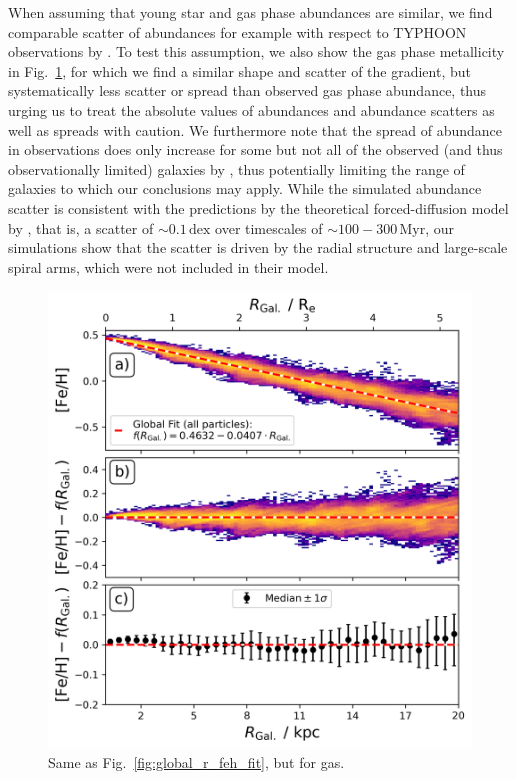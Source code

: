 \documentclass[twocolumn,apj,numberedappendix,appendixfloats]{openjournal}
\begin{document}
\begin{CJK*}{UTF8}{gbsn}
When assuming that young star and gas phase abundances are similar, we find comparable scatter of abundances for example with respect to TYPHOON observations by \citet{Chen2023}. To test this assumption, we also show the gas phase metallicity in Fig.~\ref{fig:global_r_feh_fit_gas}, for which we find a similar shape and scatter of the gradient, but systematically less scatter or spread than observed gas phase abundance, thus urging us to treat the absolute values of abundances and abundance scatters as well as spreads with caution. We furthermore note that the spread of abundance in observations does only increase for some but not all of the observed (and thus observationally limited) galaxies by \citet{Chen2023}, thus potentially limiting the range of galaxies to which our conclusions may apply. While the simulated abundance scatter is consistent with the predictions by the theoretical forced-diffusion model by \citet{Krumholz2018b}, that is, a scatter of $\sim 0.1\,\mathrm{dex}$ over timescales of $\sim 100-300\,\mathrm{Myr}$, our simulations show that the scatter is driven by the radial structure and large-scale spiral arms, which were not included in their model.

\begin{figure}
    \centering
    \includegraphics[width=\columnwidth]{figures/global_r_feh_fit_gas.png}
    \caption{Same as Fig.~\ref{fig:global_r_feh_fit}, but for gas.}
    \label{fig:global_r_feh_fit_gas}
\end{figure}


\end{CJK*}
\end{document}
